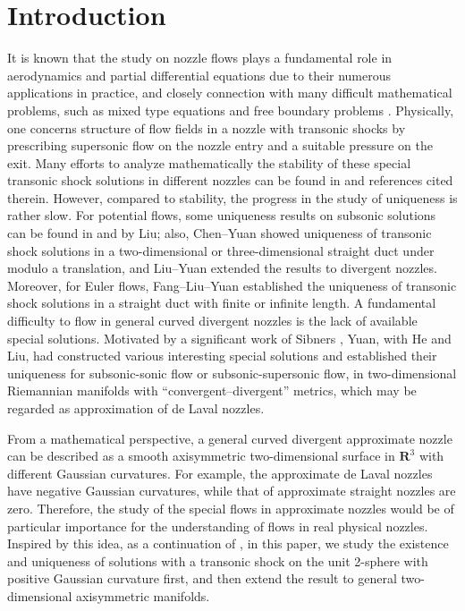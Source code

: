 \documentclass[reqno,12pt]{amsart}
\numberwithin{equation}{section}
\begin{document}
	
	
	
\section{Introduction}\label{sec1}
It is known that the study on nozzle flows plays a fundamental role in aerodynamics and partial differential equations due to their numerous applications in practice, and closely connection with many difficult mathematical problems, such as mixed type equations and free boundary problems \cite{supshockCF,mixM}. Physically, one concerns structure of flow fields in a nozzle with transonic shocks by prescribing supersonic flow on the nozzle entry and a suitable pressure on the exit. Many efforts to analyze mathematically the stability of these special transonic shock solutions in different nozzles can be found in \cite{tssdivBF,tssCF,eutssdivC,eutssductCY,FGZ,FXeuadmi,GLY,LXY,WXX,XYY} and references cited therein. However, compared to stability, the progress in the study of uniqueness is rather slow. For potential flows, some uniqueness results on subsonic solutions can be found in \cite{Lunisubduct} and \cite{LYunisubdiv} by Liu; also, Chen--Yuan \cite{2009uniductCY} showed uniqueness of transonic shock solutions in a two-dimensional or three-dimensional straight duct under modulo a translation, and Liu--Yuan\cite{unistradivYL} extended the results to divergent nozzles. Moreover, for Euler flows, Fang--Liu--Yuan \cite{FLYunieudiv} established the uniqueness of transonic shock solutions in a straight duct with finite or infinite length. A fundamental difficulty to flow in general curved divergent nozzles is the lack of available special solutions. Motivated by a significant work of Sibners \cite{no1appSS}, Yuan, with He and Liu, had constructed various interesting special solutions \cite{exampleappY} and established their uniqueness \cite{sub2soniappYL,sub2supappYH} for subsonic-sonic flow or subsonic-supersonic flow, in two-dimensional Riemannian manifolds with “convergent–divergent” metrics, which may be regarded as approximation of de Laval nozzles.


From a mathematical perspective, a general curved divergent approximate nozzle can be described as a smooth axisymmetric two-dimensional surface in $\mathbf{R}^3$ with different Gaussian curvatures. For example, the approximate de Laval nozzles have negative Gaussian curvatures, while that of approximate straight nozzles are zero. Therefore, the study of the special flows in approximate nozzles would be of particular importance for the understanding of flows in real physical nozzles. Inspired by this idea, as a continuation of \cite{unistradivYL, LYunisubdiv, sub2soniappYL}, in this paper, we study the existence and uniqueness of solutions with a transonic shock on the unit 2-sphere with positive Gaussian curvature first, and then extend the result to general two-dimensional axisymmetric manifolds. 
\end{document}
